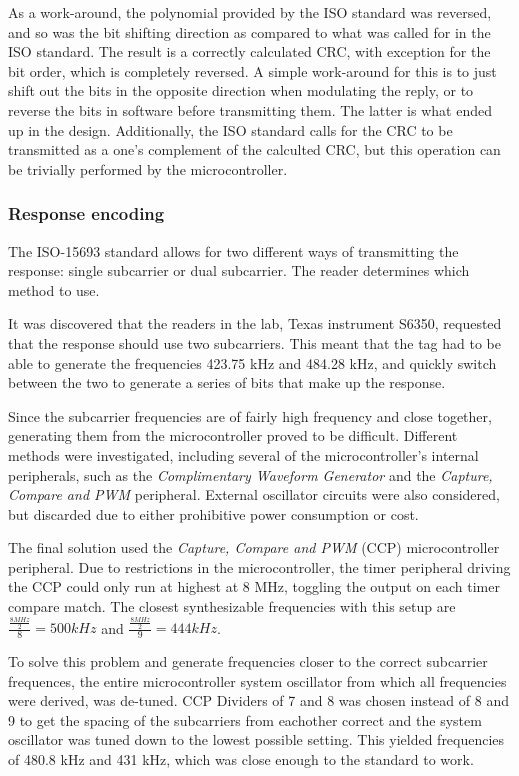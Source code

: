 As a work-around, the polynomial provided by the ISO standard was reversed, and so was the bit shifting
direction as compared to what was called for in the ISO standard. The result is a correctly calculated
CRC, with exception for the bit order, which is completely reversed. A simple work-around for this is to
just shift out the bits in the opposite direction when modulating the reply, or to reverse the bits
in software before transmitting them. The latter is what ended up in the design. Additionally, the ISO standard
calls for the CRC to be transmitted as a one's complement of the calculted CRC, but this operation
can be trivially performed by the microcontroller.


\subsubsection{Response encoding}
The ISO-15693 standard allows for two different ways of transmitting the response: single subcarrier or dual subcarrier.\cite{rfid-iso}
The reader determines which method to use.

It was discovered that the readers in the lab, Texas instrument S6350, requested that the response should use two subcarriers.
This meant that the tag had to be able to generate the frequencies 423.75 kHz and 484.28 kHz, and quickly switch between the two to generate a series of bits that make up the response.

Since the subcarrier frequencies are of fairly high frequency and close together, generating them from the microcontroller proved to be difficult.
Different methods were investigated, including several of the microcontroller's internal peripherals, such as the \emph{Complimentary Waveform Generator} and the \emph{Capture, Compare and PWM} peripheral. External oscillator circuits were also considered, but discarded due to either prohibitive power consumption or cost.

The final solution used the \emph{Capture, Compare and PWM} (CCP) microcontroller peripheral.
Due to restrictions in the microcontroller, the timer peripheral driving the CCP could only run at highest at 8 MHz, toggling the output on each timer compare match.
The closest synthesizable frequencies with this setup are $\frac{\frac{8 MHz}{2}}{8} = 500 kHz$ and $\frac{\frac{8 MHz}{2}}{9} = 444 kHz$.

To solve this problem and generate frequencies closer to the correct subcarrier frequences, the entire microcontroller system oscillator from which all frequencies were derived, was de-tuned.
CCP Dividers of 7 and 8 was chosen instead of 8 and 9 to get the spacing of the subcarriers from eachother correct and the system oscillator was tuned down to the lowest possible setting.
This yielded frequencies of 480.8 kHz and 431 kHz, which was close enough to the standard to work.

